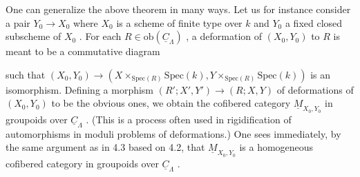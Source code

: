           One can generalize the above theorem in many ways. Let us for instance consider a pair  $Y_{0} \to X_{0}$  where  $X_{0}$  is a scheme of finite type over  $k$  and  $Y_{0}$ a fixed closed subscheme of  $X_{0}$  . For each  $R \in \mathrm{ob}(\underline{C}_{\Lambda})$  , a deformation of $(X_{0}, Y_{0})$  to  $R$  is meant to be a commutative diagram

such that  $(X_{0}, Y_{0}) \to (X \times_{\mathrm{Spec}(R)} \mathrm{Spec}(k), Y \times_{\mathrm{Spec}(R)} \mathrm{Spec}(k))$  is an isomorphism. Defining a morphism  $(R'; X', Y') \to (R; X, Y)$  of deformations of  $(X_{0}, Y_{0})$  to be the obvious ones, we obtain the cofibered category  $\underline{M}_{X_{0},Y_{0}}$  in groupoids over $\underline{C}_{\Lambda}$  . (This is a process often used in rigidification of automorphisms in moduli problems of deformations.) One sees immediately, by the same argument as in 4.3 based on 4.2, that  $\underline{M}_{X_{0},Y_{0}}$  is a homogeneous cofibered category in groupoids over $\underline{C}_{\Lambda}$  .

